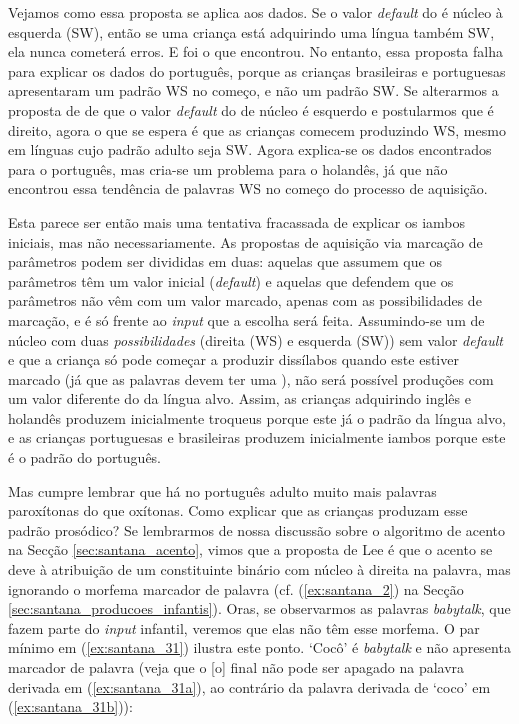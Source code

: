 \documentclass[output=paper]{LSP/langsci}
\begin{document}
Vejamos como essa proposta se aplica aos dados. Se o valor \textit{default} do  é núcleo à esquerda (SW), então se uma criança está adquirindo uma língua também SW, ela nunca cometerá erros. E foi o que \citeauthor{fikkert1994} encontrou. No entanto, essa proposta falha para explicar os dados do português, porque as crianças brasileiras e portuguesas apresentaram um padrão WS no começo, e não um padrão SW. Se alterarmos a proposta de \citeauthor{fikkert1994} de que o valor \textit{default} do  de núcleo é esquerdo e postularmos que é direito, agora o que se espera é que as crianças comecem produzindo WS, mesmo em línguas cujo padrão adulto seja SW. Agora explica-se os dados encontrados para o português, mas cria-se um problema para o holandês, já que \citeauthor{fikkert1994} não encontrou essa tendência de palavras WS no começo do processo de aquisição.

Esta parece ser então mais uma tentativa fracassada de explicar os iambos iniciais, mas não necessariamente. As propostas de aquisição via marcação de parâmetros podem ser divididas em duas: aquelas que assumem que os parâmetros têm um valor inicial (\textit{default}) e aquelas que defendem que os parâmetros não vêm com um valor marcado, apenas com as possibilidades de marcação, e é só frente ao \textit{input} que a escolha será feita. Assumindo-se um  de núcleo com duas \textit{possibilidades} (direita (WS) e esquerda (SW)) sem valor \textit{default} e que a criança só pode começar a produzir dissílabos quando este  estiver marcado (já que as palavras devem ter uma ), não será possível produções com um valor diferente do da língua alvo. Assim, as crianças adquirindo inglês e holandês produzem inicialmente troqueus porque este já o padrão da língua alvo, e as crianças portuguesas e brasileiras produzem inicialmente iambos porque este é o padrão do português. 

Mas cumpre lembrar que há no português adulto muito mais palavras paroxítonas do que oxítonas. Como explicar que as crianças produzam esse padrão prosódico? Se lembrarmos de nossa discussão sobre o algoritmo de acento na Secção \ref{sec:santana_acento}, vimos que a proposta de Lee é que o acento se deve à atribuição de um constituinte binário com núcleo à direita na palavra, mas ignorando o morfema marcador de palavra (cf. (\ref{ex:santana_2}) na Secção \ref{sec:santana_producoes_infantis}). Oras, se observarmos as palavras \textit{babytalk}, que fazem parte do \textit{input} infantil, veremos que elas não têm esse morfema. O par mínimo em (\ref{ex:santana_31}) ilustra este ponto. `Cocô' é \textit{babytalk} e não apresenta marcador de palavra (veja que o [o] final não pode ser apagado na palavra derivada em (\ref{ex:santana_31a}), ao contrário da palavra derivada de `coco' em (\ref{ex:santana_31b})):
\end{document}
